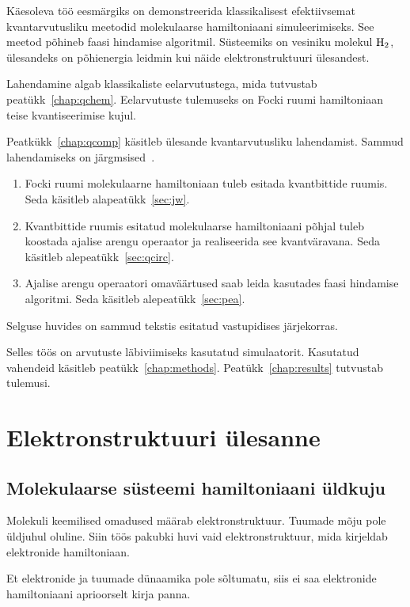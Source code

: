\documentclass[12pt]{report}
\begin{document}
Käesoleva töö eesmärgiks on demonstreerida klassikalisest efektiivsemat kvantarvutusliku meetodid molekulaarse hamiltoniaani simuleerimiseks.
See meetod põhineb faasi hindamise algoritmil.
Süsteemiks on vesiniku molekul \(\rm H_2\), ülesandeks on põhienergia leidmin kui näide elektronstruktuuri ülesandest.

Lahendamine algab klassikaliste eelarvutustega, mida tutvustab peatükk~\ref{chap:qchem}.
Eelarvutuste tulemuseks on Focki ruumi hamiltoniaan teise kvantiseerimise kujul.

Peatkükk~\ref{chap:qcomp} käsitleb ülesande kvantarvutusliku lahendamist.
Sammud lahendamiseks on järgmsised~\cite{whitfield+etal2011}.

\begin{enumerate}
    \item Focki ruumi molekulaarne hamiltoniaan tuleb esitada kvantbittide ruumis.
    Seda käsitleb alapeatükk~\ref{sec:jw}.
    \item Kvantbittide ruumis esitatud molekulaarse hamiltoniaani põhjal tuleb koostada ajalise arengu operaator ja realiseerida see kvantväravana.
    Seda käsitleb alepeatükk~\ref{sec:qcirc}.
    \item Ajalise arengu operaatori omaväärtused saab leida kasutades faasi hindamise algoritmi.
    Seda käsitleb alepeatükk~\ref{sec:pea}.
\end{enumerate}
Selguse huvides on sammud tekstis esitatud vastupidises järjekorras.

Selles töös on arvutuste läbiviimiseks kasutatud simulaatorit.
Kasutatud vahendeid käsitleb peatükk~\ref{chap:methods}.
Peatükk~\ref{chap:results} tutvustab tulemusi.

\chapter{Elektronstruktuuri ülesanne}

\section{Molekulaarse süsteemi hamiltoniaani üldkuju}

Molekuli keemilised omadused määrab elektronstruktuur.
Tuumade mõju pole üldjuhul oluline.
Siin töös pakubki huvi vaid elektronstruktuur, mida kirjeldab elektronide hamiltoniaan.

Et elektronide ja tuumade dünaamika pole sõltumatu, siis ei saa elektronide hamiltoniaani aprioorselt kirja panna.
\end{document}
